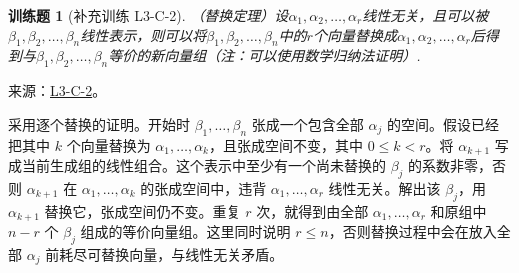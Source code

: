 \documentclass[12pt,fontset=fandol]{ctexart}
\newtheorem{exercise}{训练题}[section]
\begin{document}
\begin{exercise}[补充训练 L3-C-2]\label{prob:L3-C-2}
（替换定理）设$\alpha_1,\alpha_2,\ldots,\alpha_r$线性无关，且可以被$\beta_1,\beta_2,\ldots,\beta_n$线性表示，则可以将$\beta_1,\beta_2,\ldots,\beta_n$中的$r$个向量替换成$\alpha_1,\alpha_2,\ldots,\alpha_r$后得到与$\beta_1,\beta_2,\ldots,\beta_n$等价的新向量组（注：可以使用数学归纳法证明）.
\end{exercise}
\noindent 来源：\href{https://github.com/yhwu-is/Linear-Algebra-Left-Undone/blob/new/%E8%AE%B2%E4%B9%89/%E4%B8%93%E9%A2%98/3%20%E6%9C%89%E9%99%90%E7%BB%B4%E7%BA%BF%E6%80%A7%E7%A9%BA%E9%97%B4.tex}{L3-C-2}。
\begin{solve}
采用逐个替换的证明。开始时 $\beta_1,\ldots,\beta_n$ 张成一个包含全部 $\alpha_j$ 的空间。假设已经把其中 $k$ 个向量替换为 $\alpha_1,\ldots,\alpha_k$，且张成空间不变，其中 $0\le k<r$。将 $\alpha_{k+1}$ 写成当前生成组的线性组合。这个表示中至少有一个尚未替换的 $\beta_j$ 的系数非零，否则 $\alpha_{k+1}$ 在 $\alpha_1,\ldots,\alpha_k$ 的张成空间中，违背 $\alpha_1,\ldots,\alpha_r$ 线性无关。解出该 $\beta_j$，用 $\alpha_{k+1}$ 替换它，张成空间仍不变。重复 $r$ 次，就得到由全部 $\alpha_1,\ldots,\alpha_r$ 和原组中 $n-r$ 个 $\beta_j$ 组成的等价向量组。这里同时说明 $r\le n$，否则替换过程中会在放入全部 $\alpha_j$ 前耗尽可替换向量，与线性无关矛盾。
\end{solve}
\end{document}
